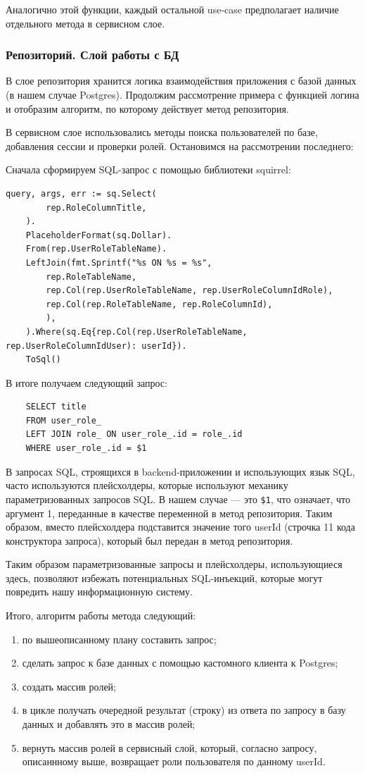 \documentclass[diploma]{SCWorks}
\begin{document}
Аналогично этой функции, каждый остальной use-case предполагает наличие 
отдельного метода в сервисном слое. 

\subsubsection{Репозиторий. Слой работы с БД}

В слое репозитория хранится логика взаимодействия приложения с базой данных 
(в нашем случае Postgres). Продолжим рассмотрение примера с функцией логина
и отобразим алгоритм, по которому действует метод репозитория.

В сервисном слое использовались методы поиска пользователей по базе, 
добавления сессии и проверки ролей. Остановимся на рассмотрении последнего:

Сначала сформируем SQL-запрос с помощью библиотеки squirrel:
\begin{verbatim}
query, args, err := sq.Select(
        rep.RoleColumnTitle,
    ).
    PlaceholderFormat(sq.Dollar).
    From(rep.UserRoleTableName).
    LeftJoin(fmt.Sprintf("%s ON %s = %s",
        rep.RoleTableName,
        rep.Col(rep.UserRoleTableName, rep.UserRoleColumnIdRole),
        rep.Col(rep.RoleTableName, rep.RoleColumnId),
        ),
    ).Where(sq.Eq{rep.Col(rep.UserRoleTableName, rep.UserRoleColumnIdUser): userId}).
    ToSql()
\end{verbatim}

В итоге получаем следующий запрос:
\begin{verbatim}
    SELECT title 
    FROM user_role_
    LEFT JOIN role_ ON user_role_.id = role_.id
    WHERE user_role_.id = $1
\end{verbatim}

В запросах SQL, строящихся в backend-приложении и использующих язык SQL, часто
используются плейсхолдеры, которые используют механику параметризованных 
запросов SQL. В нашем случае — это \texttt{\$1}, что означает, 
что аргумент 1, переданные в качестве переменной в метод репозитория. Таким 
образом, вместо плейсхолдера подставится значение того userId (строчка 11 кода 
конструктора запроса), который был передан в метод репозитория.

Таким образом параметризованные запросы и плейсхолдеры, использующиеся здесь,
позволяют избежать потенциальных SQL-инъекций, которые могут повредить 
нашу информационную систему.

Итого, алгоритм работы метода следующий:
\begin{enumerate}
    \item по вышеописанному плану составить запрос;
    \item сделать запрос к базе данных с помощью кастомного клиента к Postgres;
    \item создать массив ролей;
    \item в цикле получать очередной результат (строку) из ответа по запросу в 
    базу данных и добавлять это в массив ролей;
    \item вернуть массив ролей в сервисный слой, который, согласно запросу, 
    описаннному выше, возвращает роли пользователя по данному userId.
\end{enumerate}
\end{document}

